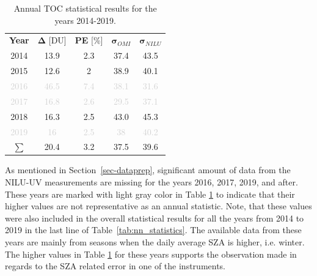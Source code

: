 \documentclass{optica-article}
\begin{document}
\begin{table}[H]
	\centering
	\begin{tabular}{| c | c | c | c | c |}
		\hline
		\textbf{Year} & $\bm{\Delta}$ [DU] & \textbf{PE} [\%]& $\bm{\sigma}_{OMI}$ & $\bm{\sigma}_{NILU}$ \\
		\Xhline{2\arrayrulewidth}
		2014      & 13.9                    & 2.3                      & 37.4                 & 43.5                     \\
		\hline
		2015      & 12.6                       & 2                       & 38.9                  & 40.1                  \\
		\hline
		\textcolor{lightgray}{2016}      & \textcolor{lightgray}{46.5}                 &  \textcolor{lightgray}{7.4}                       & \textcolor{lightgray}{38.1}                  & \textcolor{lightgray}{31.6}                  \\
		\hline
		\textcolor{lightgray}{2017}      & \textcolor{lightgray}{16.8} & \textcolor{lightgray}{2.6}        & \textcolor{lightgray}{29.5}     & \textcolor{lightgray}{37.1}   \\
		\hline
		2018      & 16.3                      & 2.5                       & 43.0                   & 45.3                \\
		\hline
		\textcolor{lightgray}{2019}      &  \textcolor{lightgray}{16}       &  \textcolor{lightgray}{2.5}       & \textcolor{lightgray}{38}				 &  \textcolor{lightgray}{40.2}					\\
		\Xhline{2\arrayrulewidth}
		$\bm{\sum}$ & 20.4 & 3.2 & 37.5 & 39.6 \\
		\hline
	\end{tabular}
	\caption{Annual TOC statistical results for the years 2014-2019.}
	\label{tab:nnstatistics}
\end{table}


As mentioned in Section~\ref{sec-dataprep}, significant amount of data from the NILU-UV measurements are missing for the years 2016, 2017, 2019, and after. 
These years are marked with light gray color in Table \ref{tab:nnstatistics} to indicate that their higher values are not representative as an annual statistic.
Note, that these values were also included in the overall statistical results for all the years from 2014 to 2019 in the last line of Table~\ref{tab:nn_statistics}. 
The available data from these years are mainly from seasons when the daily average SZA is higher, i.e. winter. 
The higher values in Table \ref{tab:nnstatistics} for these years supports the observation made in regards to the SZA related error in one of the instruments.
\end{document}
